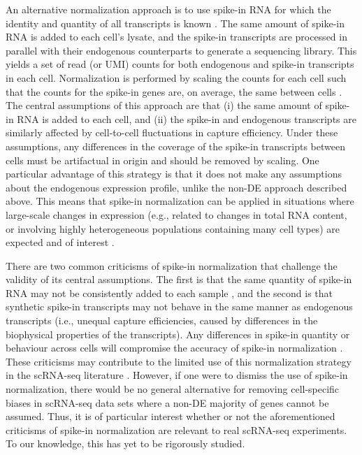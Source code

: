 \documentclass{article}
\begin{document}
An alternative normalization approach is to use spike-in RNA for which the identity and quantity of all transcripts is known \cite{stegle2015computational,bacher2016design}.
The same amount of spike-in RNA is added to each cell's lysate, and the spike-in transcripts are processed in parallel with their endogenous counterparts to generate a sequencing library.
This yields a set of read (or UMI) counts for both endogenous and spike-in transcripts in each cell.
Normalization is performed by scaling the counts for each cell such that the counts for the spike-in genes are, on average, the same between cells \cite{katayama2013samstrt}.
The central assumptions of this approach are that (i) the same amount of spike-in RNA is added to each cell, and (ii) the spike-in and endogenous transcripts are similarly affected by cell-to-cell fluctuations in capture efficiency.
Under these assumptions, any differences in the coverage of the spike-in transcripts between cells must be artifactual in origin and should be removed by scaling.
One particular advantage of this strategy is that it does not make any assumptions about the endogenous expression profile, unlike the non-DE approach described above.
This means that spike-in normalization can be applied in situations where large-scale changes in expression (e.g., related to changes in total RNA content, or involving highly heterogeneous populations containing many cell types) are expected and of interest \cite{lun2016stepbystep,nestorowa2016single}.

There are two common criticisms of spike-in normalization that challenge the validity of its central assumptions.
The first is that the same quantity of spike-in RNA may not be consistently added to each sample \cite{robinson2010tmm}, and the second is that synthetic spike-in transcripts may not behave in the same manner as endogenous transcripts \cite{grun2015design} (i.e., unequal capture efficiencies, caused by differences in the biophysical properties of the transcripts).
Any differences in spike-in quantity or behaviour across cells will compromise the accuracy of spike-in normalization \cite{risso2014normalization}.
These criticisms may contribute to the limited use of this normalization strategy in the scRNA-seq literature \cite{bacher2016design}.
However, if one were to dismiss the use of spike-in normalization, there would be no general alternative for removing cell-specific biases in scRNA-seq data sets where a non-DE majority of genes cannot be assumed.
Thus, it is of particular interest whether or not the aforementioned criticisms of spike-in normalization are relevant to real scRNA-seq experiments.
To our knowledge, this has yet to be rigorously studied.
\end{document}
